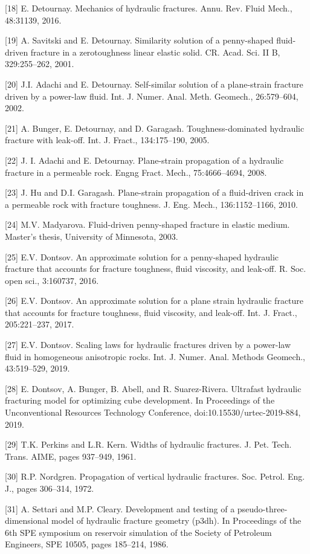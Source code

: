 \documentclass[main.tex]{subfiles}
\begin{document}
[18] E. Detournay. Mechanics of hydraulic fractures. Annu. Rev. Fluid Mech., 48:31139, 2016.

[19] A. Savitski and E. Detournay. Similarity solution of a penny-shaped fluid-driven fracture in a zerotoughness linear elastic solid. CR. Acad. Sci. II B, 329:255–262, 2001.

[20] J.I. Adachi and E. Detournay. Self-similar solution of a plane-strain fracture driven by a power-law fluid. Int. J. Numer. Anal. Meth. Geomech., 26:579–604, 2002.

[21] A. Bunger, E. Detournay, and D. Garagash. Toughness-dominated hydraulic fracture with leak-off. Int. J. Fract., 134:175–190, 2005.

[22] J. I. Adachi and E. Detournay. Plane-strain propagation of a hydraulic fracture in a permeable rock. Engng Fract. Mech., 75:4666–4694, 2008.

[23] J. Hu and D.I. Garagash. Plane-strain propagation of a fluid-driven crack in a permeable rock with fracture toughness. J. Eng. Mech., 136:1152–1166, 2010.

[24] M.V. Madyarova. Fluid-driven penny-shaped fracture in elastic medium. Master’s thesis, University of Minnesota, 2003.

[25] E.V. Dontsov. An approximate solution for a penny-shaped hydraulic fracture that accounts for fracture toughness, fluid viscosity, and leak-off. R. Soc. open sci., 3:160737, 2016.

[26] E.V. Dontsov. An approximate solution for a plane strain hydraulic fracture that accounts for fracture toughness, fluid viscosity, and leak-off. Int. J. Fract., 205:221–237, 2017.

[27] E.V. Dontsov. Scaling laws for hydraulic fractures driven by a power-law fluid in homogeneous anisotropic rocks. Int. J. Numer. Anal. Methods Geomech., 43:519–529, 2019.

[28] E. Dontsov, A. Bunger, B. Abell, and R. Suarez-Rivera. Ultrafast hydraulic fracturing model for optimizing cube development. In Proceedings of the Unconventional Resources Technology Conference, doi:10.15530/urtec-2019-884, 2019.

[29] T.K. Perkins and L.R. Kern. Widths of hydraulic fractures. J. Pet. Tech. Trans. AIME, pages 937–949, 1961.

[30] R.P. Nordgren. Propagation of vertical hydraulic fractures. Soc. Petrol. Eng. J., pages 306–314, 1972.

[31] A. Settari and M.P. Cleary. Development and testing of a pseudo-three-dimensional model of hydraulic fracture geometry (p3dh). In Proceedings of the 6th SPE symposium on reservoir simulation of the Society of Petroleum Engineers, SPE 10505, pages 185–214, 1986.
\end{document}
